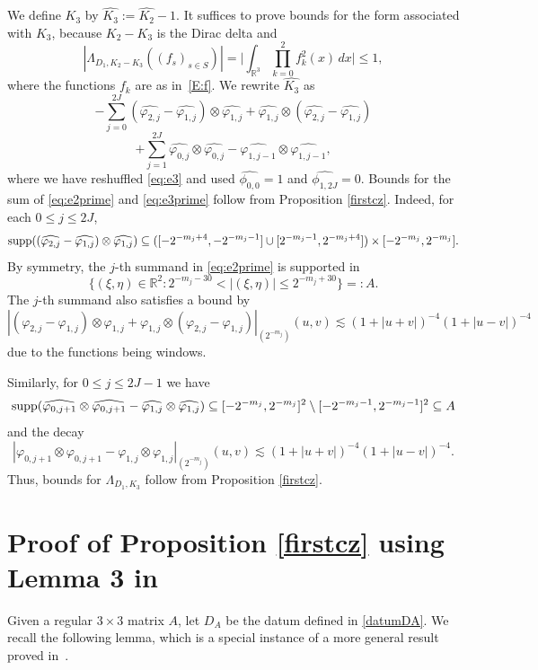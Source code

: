 \documentclass[12pt,reqno]{amsart}
\theoremstyle{plain}
\theoremstyle{definition}
\numberwithin{equation}{section}
\newcommand{\R}{{\mathbb R}}
\begin{document}
We define $K_3$ by $\widehat{K_3}:=\widehat{K_2}-1$.
It suffices to prove bounds for the form associated with $K_3$, because
$K_2-K_3$ is the Dirac delta and 
\[|\Lambda_{D_1,K_2-K_3}((f_s)_{s\in S})|=\Big |\int_{\R^3} \prod_{k=0}^{2} f_k^2(x) \, dx \Big |\le 1,\]
where the functions $f_k$ are as in~\eqref{E:f}.
We rewrite $\widehat{K_3}$ as
\begin{equation}\label{eq:e2prime}
-\sum_{j=0}^{2J}(\widehat{\varphi_{2,j}} -\widehat{\varphi_{1,j}})\otimes   \widehat{\varphi_{1,j}}
+\widehat{\varphi_{1,j}}\otimes  (\widehat{\varphi_{2,j}} -\widehat{\varphi_{1,j}})  
\end{equation}
\begin{equation}\label{eq:e3prime}
+\sum_{j=1}^{2J}\widehat{\varphi_{0,j}}\otimes   \widehat{\varphi_{0,j}}
-\widehat{\varphi_{1,j-1}}\otimes   \widehat{\varphi_{1,j-1}},
\end{equation}
where we have reshuffled \eqref{eq:e3} and used $\widehat{\phi_{0,0}}=1$ and $\widehat{\phi_{1,2J}}=0$.
Bounds for the sum of \eqref{eq:e2prime} and \eqref{eq:e3prime} follow from Proposition  \ref{firstcz}. Indeed,  
for each $0\leq j \leq 2J$,  
\[\textup{supp}((\widehat{\varphi_{2,j}} -\widehat{\varphi_{1,j}})\otimes   \widehat{\varphi_{1,j}}) \subseteq ([-2^{-m_j+4},-2^{-m_j-1}]\cup [2^{-m_j-1},2^{-m_j+4}])\times [-2^{-m_j},2^{-m_j}].\]
By symmetry, the $j$-th summand in  \eqref{eq:e2prime} is supported in 
\[ \{(\xi,\eta)\in \R^2: 2^{-m_j-30} < |(\xi,\eta)| \leq 2^{-m_j+30}\} =: A.\]
The  $j$-th summand also satisfies 
 a bound by
 \[ |({\varphi_{2,j}} -{\varphi_{1,j}})\otimes   {\varphi_{1,j}}
+{\varphi_{1,j}}\otimes  ({\varphi_{2,j}} -{\varphi_{1,j}})|_{(2^{-m_j})} (u,v)   \lesssim    (1+|u+v|)^{-4} (1+|u-v|)^{-4} \]
 due to the functions being windows. 

Similarly,   for $0\leq j \leq 2J-1$ we have
 \[\textup{supp}(\widehat{\varphi_{0,j+1}} \otimes \widehat{\varphi_{0,j+1}}- \widehat{\varphi_{1,j}}\otimes   \widehat{\varphi_{1,j}}) \subseteq  [-2^{-m_j},2^{-m_j}]^2\setminus [-2^{-m_j-1},2^{-m_j-1}]^2 \subseteq A \]
and the decay
\[   |{\varphi_{0,j+1}} \otimes {\varphi_{0,j+1}}- {\varphi_{1,j}}\otimes   {\varphi_{1,j}}|_{(2^{-m_j})}(u,v) \lesssim   (1+|u+v|)^{-4} (1+|u-v|)^{-4}. \]
Thus, bounds for $\Lambda_{D_1, K_3}$ follow from  Proposition \ref{firstcz}. 

 


 



\section{Proof of Proposition \ref{firstcz} using Lemma 3 in \texorpdfstring{\cite{MR4171366}}{}
}
\label{sec:firstcz}
Given a regular $3\times 3$ matrix $A$, let     $D_A$ be the datum defined in \eqref{datumDA}. 
We   recall the following lemma, which is a special instance of a more general result proved in~\cite{MR4171366}. 
\end{document}
